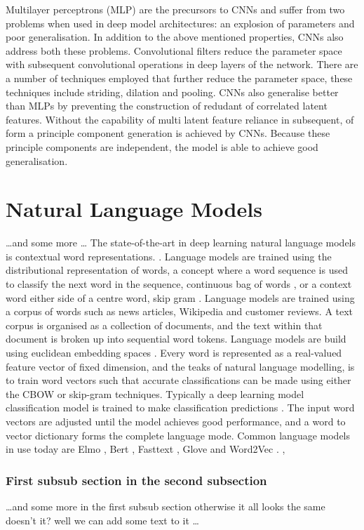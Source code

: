 Multilayer perceptrons (MLP) are the precursors to CNNs and suffer from two problems when used in deep model architectures: an explosion of parameters and poor generalisation. In addition to the above mentioned properties, CNNs also address both these problems. Convolutional filters reduce the parameter space with subsequent convolutional operations in deep layers of the network. There are a number of techniques employed that further reduce the parameter space, these techniques include striding, dilation and pooling. CNNs also generalise better than MLPs by preventing the construction of redudant of correlated latent features. Without the capability of multi latent feature reliance in subsequent, of form a principle component generation is achieved by CNNs. Because these principle components are independent, the model is able to achieve good generalisation. 

\section{Natural Language Models}
\dots and some more \dots
The state-of-the-art in deep learning natural language models is contextual word representations. \citet{reference}. Language models are trained using the distributional representation of words, a concept where a word sequence is used to classify the next word in the sequence, continuous bag of words \cite{reference}, or a context word either side of a centre word, skip gram \cite{reference}. Language models are trained using a corpus of words such as news articles, Wikipedia and customer reviews. A text corpus is organised as a collection of documents, and the text within that document is broken up into sequential word tokens. Language models are build using euclidean embedding spaces \cite{reference}. Every word is represented as a real-valued feature vector of fixed dimension, and the teaks of natural language modelling, is to train word vectors such that accurate classifications can be made using either the CBOW or skip-gram techniques. Typically a deep learning model classification model is trained to make classification predictions \cite {reference}. The input word vectors are adjusted until the model achieves good performance, and a word to vector dictionary forms the complete language mode. Common language models in use today are Elmo \cite{reference}, Bert \cite{reference}, Fasttext \cite{reference}, Glove \cite{refernce} and Word2Vec \cite{reference}.
, 
\subsubsection{First subsub section in the second subsection}
\dots and some more in the first subsub section otherwise it all looks the same
doesn't it? well we can add some text to it \dots

